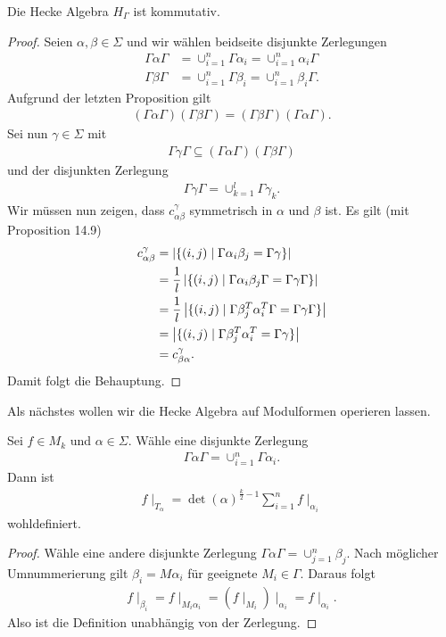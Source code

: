 \begin{thm}
Die Hecke Algebra $H_\Gamma$ ist kommutativ.
\end{thm}
\begin{proof}
Seien $\alpha, \beta \in \Sigma$ und wir wählen beidseite disjunkte Zerlegungen
\begin{align*}
\Gamma \alpha \Gamma &=\cup_{i=1}^n \Gamma \alpha_i=\cup_{i=1}^n \alpha_i \Gamma\\
\Gamma \beta \Gamma &=\cup_{i=1}^n \Gamma \beta_i=\cup_{i=1}^n \beta_i \Gamma.
\end{align*}
Aufgrund der letzten Proposition gilt
\begin{align*}
(\Gamma \alpha \Gamma)(\Gamma \beta \Gamma)=(\Gamma \beta \Gamma)(\Gamma \alpha \Gamma).
\end{align*}
Sei nun $\gamma \in \Sigma$ mit
\begin{align*}
\Gamma \gamma \Gamma\subseteq (\Gamma \alpha \Gamma)(\Gamma \beta \Gamma)
\end{align*}
und der disjunkten Zerlegung
\begin{align*}
\Gamma \gamma \Gamma =\cup_{k=1}^l \Gamma \gamma_k.
\end{align*}
Wir müssen nun zeigen, dass $c_{\alpha \beta}^\gamma$ symmetrisch in $\alpha$ und $\beta$ ist.
Es gilt (mit Proposition 14.9)
\begin{align*}
c_{\alpha \beta}^\gamma &=\left\vert\{(i,j)\mid \Gamma \alpha_i \beta_j=\Gamma \gamma\}\right\vert\\
&=\frac{1}{l}\left\vert\{(i,j)\mid \Gamma \alpha_i \beta_j \Gamma=\Gamma \gamma \Gamma\}\right\vert\\
&=\frac{1}{l}\left\vert\{(i,j)\mid \Gamma \beta_j^T \alpha_i^T\Gamma =\Gamma \gamma \Gamma\}\right\vert\\
&=\left\vert\{(i,j)\mid \Gamma \beta_j^T \alpha_i^T=\Gamma \gamma\}\right\vert\\
&=c_{\beta \alpha}^\gamma.
\end{align*}
Damit folgt die Behauptung.
\end{proof}

Als nächstes wollen wir die Hecke Algebra auf Modulformen operieren lassen.
\begin{prop}
Sei $f \in M_k$ und $\alpha \in \Sigma$.
Wähle eine disjunkte Zerlegung
\begin{align*}
\Gamma \alpha \Gamma=\cup_{i=1}^n \Gamma \alpha_i.
\end{align*}
Dann ist
\begin{align*}
f\mid_{T_\alpha}=\det(\alpha)^{\frac{k}{2}-1} \sum_{i=1}^n f \mid_{\alpha_i}
\end{align*}
wohldefiniert.
\end{prop}
\begin{proof}
Wähle eine andere disjunkte Zerlegung $\Gamma \alpha \Gamma=\cup_{j=1}^n \beta_j$.
Nach möglicher Umnummerierung gilt $\beta_i=M \alpha_i$ für geeignete $M_i \in \Gamma$.
Daraus folgt
\begin{align*}
f\mid_{\beta_i}=f\mid_{M_i \alpha_i} =(f \mid_{M_i})\mid_{\alpha_i}=f\mid_{\alpha_i}.
\end{align*}
Also ist die Definition unabhängig von der Zerlegung.
\end{proof}


